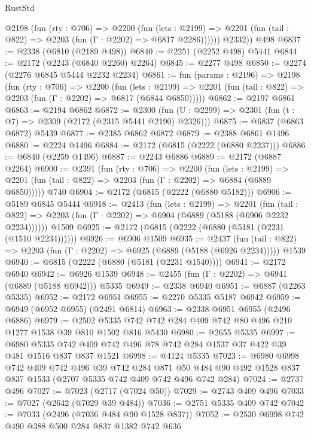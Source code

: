 \begin{lexlean}{RustStd}
\begin{coremodule}
          @2198
            (fun (rty : @706) =>
            @2200
              (fun (lets : @2199) =>
              @2201 (fun (tail : @822) => @2203 (fun (Γ : @2202) => @6817 @2286))))))
        @2332))
    @498
@6837 := @2338 (@6810 (@2189 @498))
@6840 := @2251 (@2252 @498) @5441
@6844 := @2172 (@2243 (@6840 @2260) @2264)
@6845 := @2277 @498
@6850 := @2274 (@2276 @6845 @5444 @2232 @2234)
@6861 := fun (params : @2196) =>
  @2198
    (fun (rty : @706) =>
    @2200
      (fun (lets : @2199) =>
      @2201 (fun (tail : @822) => @2203 (fun (Γ : @2202) => @6817 (@6844 @6850)))))
@6862 := @2197 @6861
@6863 := @2194 @6862
@6872 := @2300 (fun (U : @2299) => @2301 (fun (t : @7) => @2309 (@2172 (@2315 @5441 @2190) @2326)))
@6875 := @6837 (@6863 @6872) @5439
@6877 := @2385 @6862 @6872
@6879 := @2388 @6861 @1496
@6880 := @2224 @1496
@6884 := @2172 (@6815 (@2222 (@6880 @2237)))
@6886 := @6840 (@2259 @1496)
@6887 := @2243 @6886
@6889 := @2172 (@6887 @2264)
@6900 := @2391
    (fun (rty : @706) =>
    @2200
      (fun (lets : @2199) =>
      @2201 (fun (tail : @822) => @2203 (fun (Γ : @2202) => @6884 (@6889 @6850)))))
    @740
@6904 := @2172 (@6815 (@2222 (@6880 @5182)))
@6906 := @5189 @6845 @5444
@6918 := @2413
    (fun (lets : @2199) =>
    @2201
      (fun (tail : @822) => @2203 (fun (Γ : @2202) => @6904 (@6889 (@5188 (@6906 @2232 @2234))))))
    @1509
@6925 := @2172 (@6815 (@2222 (@6880 (@5181 (@2231 (@1510 @2234))))))
@6926 := @6906 @1509
@6935 := @2437
    (fun (tail : @822) => @2203 (fun (Γ : @2202) => @6925 (@6889 (@5188 (@6926 @2234)))))
    @1539
@6940 := @6815 (@2222 (@6880 (@5181 (@2231 @1540))))
@6941 := @2172 @6940
@6942 := @6926 @1539
@6948 := @2455 (fun (Γ : @2202) => @6941 (@6889 (@5188 @6942))) @5335
@6949 := @2338 @6940
@6951 := @6887 (@2263 @5335)
@6952 := @2172 @6951
@6955 := @2270 @5335 @5187 @6942
@6959 := @6949 (@6952 @6955) (@2491 @6814)
@6963 := @2338 @6951 @6955 (@2496 @6886)
@6979 := @2502 @5335 @742 @742 @284 @409 @742 @80 @496 @210 @1277 @1538 @39 @810 @1502 @816 @5430
@6980 := @2655 @5335
@6997 := @6980 @5335 @742 @409 @742 @496 @78 @742 @284 @1537 @37 @422 @39 @481 @1516 @837 @837 @1521
@6998 := @4124 @5335
@7023 := @6980
    @6998
    @742
    @409
    @742
    @496
    @39
    @742
    @284
    @871
    @50
    @484
    @90
    @492
    @1528
    @837
    @837
    @1533
    (@2707 @5335 @742 @409 @742 @496 @742 @284)
@7024 := @2737 @496
@7027 := @7023 (@2717 (@7024 @50))
@7029 := @2743 @409 @496
@7033 := @7027 (@2642 (@7029 @39 @484))
@7036 := @2751 @5335 @409 @742
@7042 := @7033 (@2496 (@7036 @484 @90 @1528 @837))
@7052 := @2530 @6998 @742 @490 @388 @500 @284 @837 @1382 @742 @636

\end{coremodule}
\end{lexlean}
